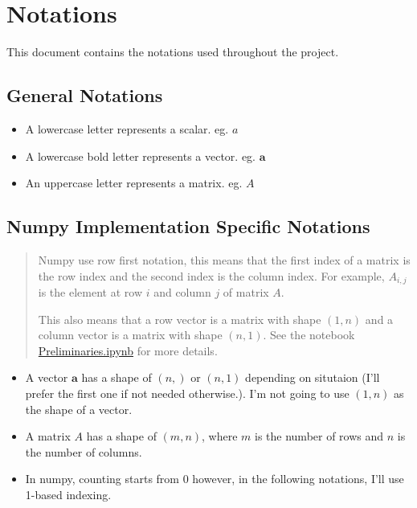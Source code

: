 \hypertarget{notations}{%
\section{Notations}\label{notations}}

This document contains the notations used throughout the project.

\hypertarget{general-notations}{%
\subsection{General Notations}\label{general-notations}}

\begin{itemize}
\tightlist
\item
  A lowercase letter represents a scalar. eg. \(a\)
\item
  A lowercase bold letter represents a vector. eg. \(\mathbf{a}\)
\item
  An uppercase letter represents a matrix. eg. \(A\)
\end{itemize}

\hypertarget{numpy-implementation-specific-notations}{%
\subsection{Numpy Implementation Specific
Notations}\label{numpy-implementation-specific-notations}}

\begin{quote}
Numpy use row first notation, this means that the first index of a
matrix is the row index and the second index is the column index. For
example, \(A_{i,j}\) is the element at row \(i\) and column \(j\) of
matrix \(A\).

This also means that a row vector is a matrix with shape \((1, n)\) and
a column vector is a matrix with shape \((n, 1)\). See the notebook
\url{Preliminaries.ipynb} for more details.
\end{quote}

\begin{itemize}
\tightlist
\item
  A vector \(\mathbf{a}\) has a shape of \((n,)\) or \((n, 1)\)
  depending on situtaion (I'll prefer the first one if not needed
  otherwise.). I'm not going to use \((1,n)\) as the shape of a vector.
\item
  A matrix \(A\) has a shape of \((m, n)\), where \(m\) is the number of
  rows and \(n\) is the number of columns.
\item
  In numpy, counting starts from 0 however, in the following notations,
  I'll use 1-based indexing.
\end{itemize}

